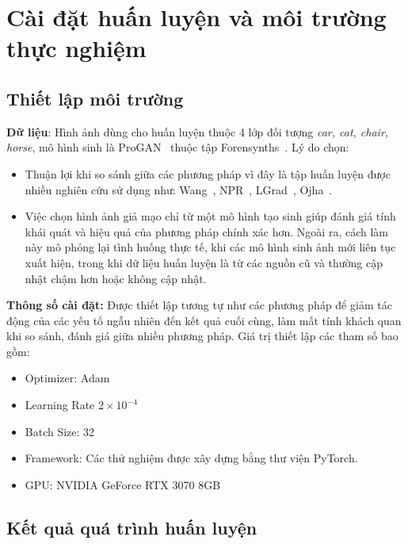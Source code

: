 \section{Cài đặt huấn luyện và môi trường thực nghiệm}

\subsection{Thiết lập môi trường}

\textbf{Dữ liệu}: Hình ảnh dùng cho huấn luyện thuộc 4 lớp đối tượng \textit{car, cat, chair, horse}, mô hình sinh là ProGAN~\cite{karras2018progressive} thuộc tập Forensynths~\cite{Wang2019CNNGeneratedIA}. Lý do chọn:
\begin{itemize}
	\item Thuận lợi khi so sánh giữa các phương pháp vì đây là tập huấn luyện được nhiều nghiên cứu sử dụng như: Wang~\cite{Wang2019CNNGeneratedIA}, NPR~\cite{Tan2023RethinkingTU}, LGrad~\cite{Tan2023LearningOG}, Ojha~\cite{Ojha2023TowardsUF}. 
	\item Việc chọn hình ảnh giả mạo chỉ từ một mô hình tạo sinh giúp đánh giá tính khái quát và hiệu quả của phương pháp chính xác hơn. Ngoài ra, cách làm này mô phỏng lại tình huống thực tế, khi các mô hình sinh ảnh mới liên tục xuất hiện, trong khi dữ liệu huấn luyện là từ các nguồn cũ và thường cập nhật chậm hơn hoặc không cập nhật.
\end{itemize}

\textbf{Thông số cài đặt:} Được thiết lập tương tự như các phương pháp \cite{Wang2019CNNGeneratedIA, Tan2023RethinkingTU,Tan2023LearningOG} để giảm tác động của các yếu tố ngẫu nhiên đến kết quả cuối cùng, làm mất tính khách quan khi so sánh, đánh giá giữa nhiều phương pháp. Giá trị thiết lập các tham số bao gồm:
	\begin{itemize}
		\item Optimizer: Adam
		\item Learning Rate $2 \times 10^{-4}$
		\item Batch Size: 32
		\item Framework: Các thử nghiệm được xây dựng bằng thư viện PyTorch.
		\item GPU: NVIDIA GeForce RTX 3070 8GB
	\end{itemize}

\subsection{Kết quả quá trình huấn luyện}


